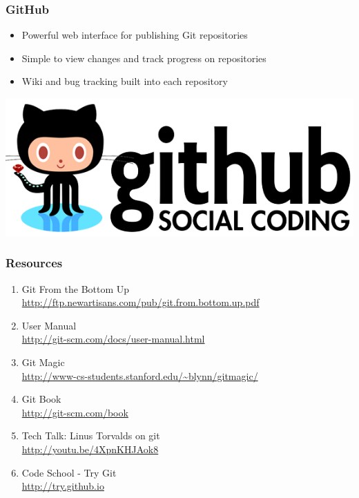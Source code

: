 \documentclass[english,compress]{beamer}
\begin{document}
\frame
{
    \frametitle{GitHub}

    \begin{itemize}
        \item Powerful web interface for publishing Git repositories
        \item Simple to view changes and track progress on repositories
        \item Wiki and bug tracking built into each repository 
    \end{itemize}
    
    \begin{center}
        \includegraphics[width=.8\textwidth]{figs/github-logo.png}
    \end{center}
}


\frame
{
\small
    \frametitle{Resources}
    \begin{enumerate}
        \item Git From the Bottom Up\\
            \url{http://ftp.newartisans.com/pub/git.from.bottom.up.pdf}
        \item User Manual\\
            \url{http://git-scm.com/docs/user-manual.html}
        \item Git Magic\\
            \url{http://www-cs-students.stanford.edu/~blynn/gitmagic/}
        \item Git Book\\
            \url{http://git-scm.com/book}
        \item Tech Talk: Linus Torvalds on git\\
            \url{http://youtu.be/4XpnKHJAok8} 
        \item Code School - Try Git\\
            \url{http://try.github.io}
    \end{enumerate}
}
\end{document}
